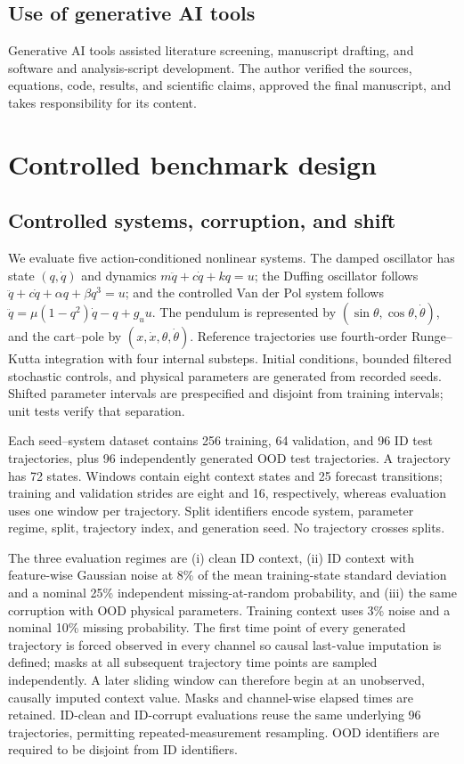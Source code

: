 \documentclass[pdflatex,sn-basic]{sn-jnl}
\begin{document}
\subsection{Use of generative AI tools}

Generative AI tools assisted literature screening, manuscript drafting, and
software and analysis-script development. The author verified the sources, equations, code, results, and scientific claims, approved the final manuscript, and takes responsibility for its content.

\section{Controlled benchmark design}

\subsection{Controlled systems, corruption, and shift}

We evaluate five action-conditioned nonlinear systems. The damped oscillator
has state $(q,\dot q)$ and dynamics $m\ddot q+c\dot q+kq=u$; the Duffing
oscillator follows $\ddot q+c\dot q+\alpha q+\beta q^3=u$; and the controlled
Van der Pol system follows
$\ddot q=\mu(1-q^2)\dot q-q+g_u u$. The pendulum is represented by
$(\sin\theta,\cos\theta,\dot\theta)$, and the cart--pole by
$(x,\dot x,\theta,\dot\theta)$. Reference trajectories use fourth-order
Runge--Kutta integration with four internal substeps. Initial conditions,
bounded filtered stochastic controls, and physical parameters are generated
from recorded seeds. Shifted parameter intervals are prespecified and disjoint
from training intervals; unit tests verify that separation.

Each seed--system dataset contains 256 training, 64 validation, and 96 ID test
trajectories, plus 96 independently generated OOD test trajectories. A
trajectory has 72 states. Windows contain eight context states and 25 forecast
transitions; training and validation strides are eight and 16, respectively,
whereas evaluation uses one window per trajectory. Split identifiers encode
system, parameter regime, split, trajectory index, and generation seed. No
trajectory crosses splits.

The three evaluation regimes are (i) clean ID context, (ii) ID context with
feature-wise Gaussian noise at 8\% of the mean training-state standard
deviation and a nominal 25\% independent missing-at-random probability, and
(iii) the same corruption with OOD physical parameters. Training context uses
3\% noise and a nominal 10\% missing probability. The first time point of every
generated trajectory is forced observed in every channel so causal last-value
imputation is defined; masks at all subsequent trajectory time points are
sampled independently. A later sliding window can therefore begin at an
unobserved, causally imputed context value. Masks and channel-wise elapsed times
are retained. ID-clean and ID-corrupt evaluations reuse the same underlying 96
trajectories, permitting repeated-measurement resampling. OOD identifiers are
required to be disjoint from ID identifiers.
\end{document}
